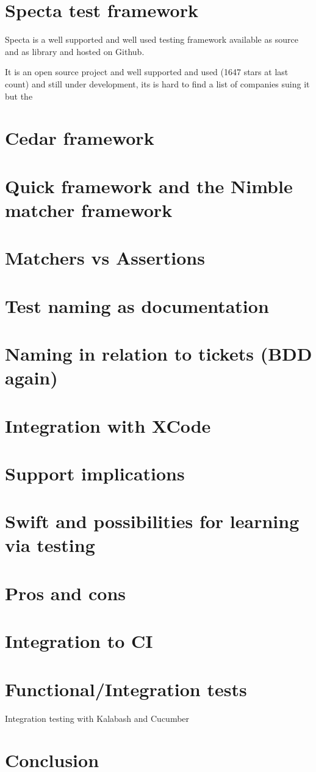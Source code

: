 \documentclass[a4paper, titlepage]{article}
\begin{document}
  \section{Specta test framework}
  Specta is a well supported and well used testing framework available
  as source and as library and hosted on Github.

  It is an open source project and well supported and used (1647 stars
  at last count) and still under development, its is hard to find a list
  of companies suing it but the 
\section{Cedar framework}
\section{Quick framework and the Nimble matcher framework}
\section{Matchers vs Assertions}
\section{Test naming as documentation}
\section{Naming in relation to tickets (BDD again)}
\section{Integration with XCode}
\section{Support implications}
  \section{Swift and possibilities for learning via testing}
\section{Pros and cons}
\section{Integration to CI}
\section{Functional/Integration tests}\label{sec:integration tests}
  Integration testing with Kalabash and Cucumber
\section{Conclusion}
  
\end{document}
